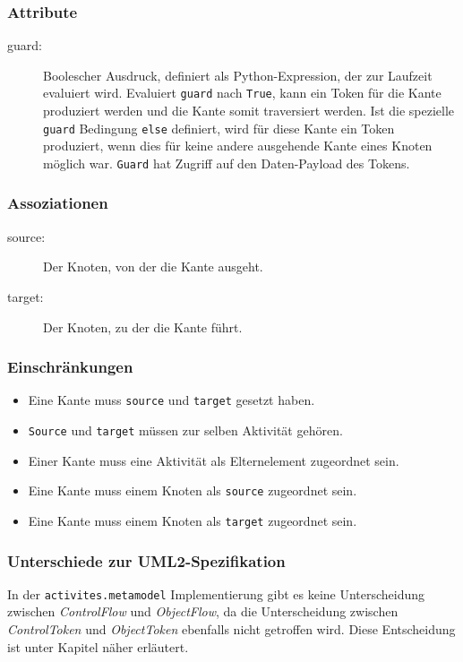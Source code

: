 \subsubsection{Attribute}
\begin{description}
\item[guard:] Boolescher Ausdruck, definiert als Python-Expression, der zur Laufzeit evaluiert wird. Evaluiert \texttt{guard} nach \texttt{True}, kann ein Token für die Kante produziert werden und die Kante somit traversiert werden. Ist die spezielle \texttt{guard} Bedingung \texttt{else} definiert, wird für diese Kante ein Token produziert, wenn dies für keine andere ausgehende Kante eines Knoten möglich war. \texttt{Guard} hat Zugriff auf den Daten-Payload des Tokens.
\end{description}

\subsubsection{Assoziationen}
\begin{description}
\item[source:] Der Knoten, von der die Kante ausgeht.
\item[target:] Der Knoten, zu der die Kante führt.
\end{description}

\subsubsection{Einschränkungen}
\begin{itemize}
\item Eine Kante muss \texttt{source} und \texttt{target} gesetzt haben.
\item \texttt{Source} und \texttt{target} müssen zur selben Aktivität gehören.
\item Einer Kante muss eine Aktivität als Elternelement zugeordnet sein.
\item Eine Kante muss einem Knoten als \texttt{source} zugeordnet sein.
\item Eine Kante muss einem Knoten als \texttt{target} zugeordnet sein.
\end{itemize}

\subsubsection{Unterschiede zur UML2-Spezifikation}
In der \texttt{activites.metamodel} Implementierung gibt es keine Unterscheidung zwischen \emph{ControlFlow} und \emph{ObjectFlow}, da die Unterscheidung zwischen \emph{ControlToken} und \emph{ObjectToken} ebenfalls nicht getroffen wird. Diese Entscheidung ist unter Kapitel  näher erläutert.

